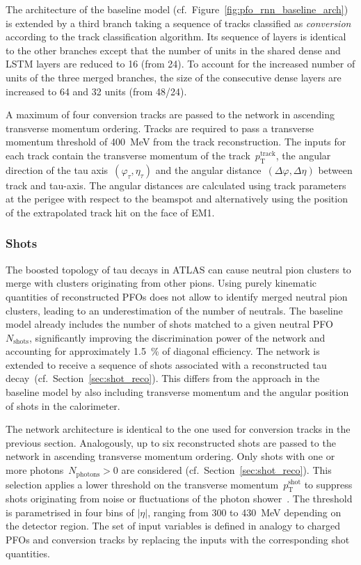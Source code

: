 The architecture of the baseline model (cf.\
Figure~\ref{fig:pfo_rnn_baseline_arch}) is extended by a third branch taking a
sequence of tracks classified as \emph{conversion} according to the track
classification algorithm. Its sequence of layers is identical to the other
branches except that the number of units in the shared dense and LSTM layers are
reduced to 16 (from 24). To account for the increased number of units of the
three merged branches, the size of the consecutive dense layers are increased to
64 and 32 units (from 48/24).

A maximum of four conversion tracks are passed to the network in ascending
transverse momentum ordering. Tracks are required to pass a transverse momentum
threshold of \SI{400}{\MeV} from the track reconstruction. The inputs for each
track contain the transverse momentum of the track~$p_\text{T}^\text{track}$,
the angular direction of the tau axis~$(\varphi_\tau, \eta_\tau)$ and the
angular distance~$(\Delta\varphi, \Delta\eta)$ between track and tau-axis. The
angular distances are calculated using track parameters at the perigee with
respect to the beamspot and alternatively using the position of the extrapolated
track hit on the face of EM1.

\subsubsection{Shots}

The boosted topology of tau decays in ATLAS can cause neutral pion clusters to
merge with clusters originating from other pions. Using purely kinematic
quantities of reconstructed PFOs does not allow to identify merged neutral pion
clusters, leading to an underestimation of the number of neutrals. The baseline
model already includes the number of shots matched to a given neutral
PFO~$N_\text{shots}$, significantly improving the discrimination power of the
network and accounting for approximately \SI{1.5}{\percent} of diagonal
efficiency. The network is extended to receive a sequence of shots associated
with a reconstructed tau decay~(cf.\ Section~\ref{sec:shot_reco}). This differs
from the approach in the baseline model by also including transverse momentum
and the angular position of shots in the calorimeter.

The network architecture is identical to the one used for conversion tracks in
the previous section. Analogously, up to six reconstructed shots are passed to
the network in ascending transverse momentum ordering. Only shots with one or
more photons~$N_\text{photons} > 0$ are considered (cf.\
Section~\ref{sec:shot_reco}). This selection applies a lower threshold on the
transverse momentum~$p_\text{T}^\text{shot}$ to suppress shots originating from
noise or fluctuations of the photon shower~\cite{atlas:taurec:decaymodes}. The
threshold is parametrised in four bins of $|\eta|$, ranging from \num{300} to
\SI{430}{\MeV} depending on the detector region.
The set of input variables is defined in analogy to charged PFOs and conversion
tracks by replacing the inputs with the corresponding shot quantities.

